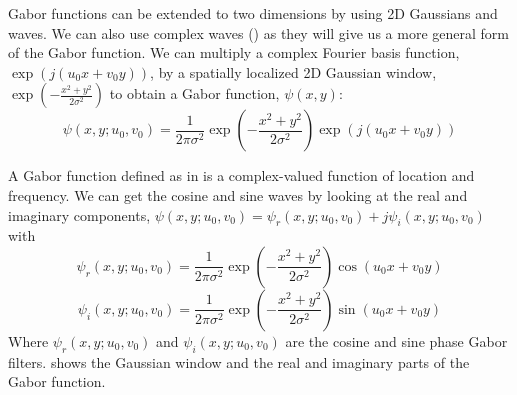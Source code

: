 Gabor functions can be extended to two dimensions by using 2D Gaussians and waves. We can also use complex waves (\chap{\ref{chapter:fourier_analysis}}) as they will give us a more general form of the Gabor function. We can  multiply a complex Fourier basis function, $\exp{ \left(j  \left(u_0 x + v_0 y \right)  \right)}$,  by a spatially localized 2D Gaussian window, $\exp{\left(-\frac{x^2 + y^2}{2 \sigma^2} \right) }$ to obtain a Gabor function, 
$\psi(x,y)$:
\begin{equation}
\psi(x,y;u_0,v_0) = \frac{1}{2\pi \sigma^2} \exp{\left(-\frac{x^2 + y^2}{2 \sigma^2} \right)} \exp{ \left( j \left(u_0 x + v_0 y \right) \right)}
\label{eq:gaborcomplexfilter}
\end{equation}

A Gabor function defined as in \eqn{\ref{eq:gaborcomplexfilter}} is a complex-valued function of location and frequency. We can get the cosine and sine waves by looking at the real and imaginary components, $\psi(x,y;u_0,v_0) =  \psi_r(x,y;u_0,v_0) + j \psi_i(x,y;u_0,v_0)$ with
\begin{equation}
\psi_r(x,y;u_0,v_0) = \frac{1}{2\pi \sigma^2} \exp{\left(-\frac{x^2 + y^2}{2 \sigma^2} \right)} \cos{ \left(u_0 x + v_0 y \right) }
\end{equation}
\begin{equation}
\psi_i(x,y;u_0,v_0) = \frac{1}{2\pi \sigma^2} \exp{\left(-\frac{x^2 + y^2}{2 \sigma^2} \right)} \sin{ \left(u_0 x + v_0 y \right) }
\end{equation}
Where $\psi_r(x,y;u_0,v_0)$ and $\psi_i(x,y;u_0,v_0)$ are the cosine and sine phase Gabor filters. \Fig{\ref{fig:gabors}} shows the Gaussian window and the real and imaginary parts of the Gabor function. 


%
%




